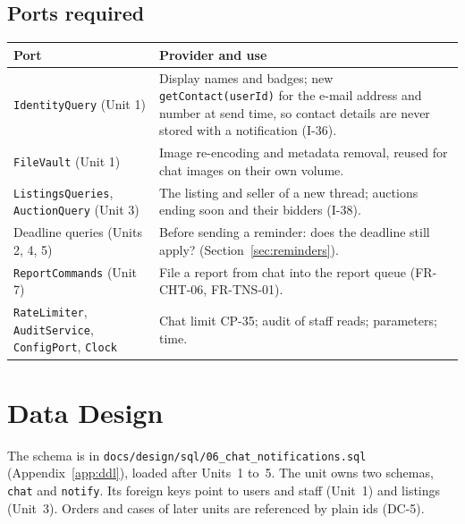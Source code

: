 \documentclass[11pt,a4paper]{article}
\newenvironment{dtable}[1]{\small\begin{longtable}{#1}}{\end{longtable}}
\begin{document}
\subsection{Ports required}
\begin{dtable}{@{}>{\raggedright\arraybackslash}p{4.6cm}>{\raggedright\arraybackslash}p{10.6cm}@{}}
\toprule
\textbf{Port} & \textbf{Provider and use} \\ \midrule \endhead
\texttt{IdentityQuery} (Unit 1) & Display names and badges; new \texttt{getContact(userId)} for the e-mail address and number at send time, so contact details are never stored with a notification (I-36). \\
\texttt{FileVault} (Unit 1) & Image re-encoding and metadata removal, reused for chat images on their own volume. \\
\texttt{ListingsQueries}, \texttt{AuctionQuery} (Unit 3) & The listing and seller of a new thread; auctions ending soon and their bidders (I-38). \\
Deadline queries (Units 2, 4, 5) & Before sending a reminder: does the deadline still apply? (Section~\ref{sec:reminders}). \\
\texttt{ReportCommands} (Unit 7) & File a report from chat into the report queue (FR-CHT-06, FR-TNS-01). \\
\texttt{RateLimiter}, \texttt{AuditService}, \texttt{ConfigPort}, \texttt{Clock} & Chat limit CP-35; audit of staff reads; parameters; time. \\
\bottomrule
\end{dtable}
\section{Data Design}
\label{sec:data}
The schema is in \texttt{docs/design/sql/06\_chat\_notifications.sql} (Appendix~\ref{app:ddl}), loaded after Units~1 to~5. The unit owns two schemas, \texttt{chat} and \texttt{notify}. Its foreign keys point to users and staff (Unit~1) and listings (Unit~3). Orders and cases of later units are referenced by plain ids (DC-5).
\end{document}

